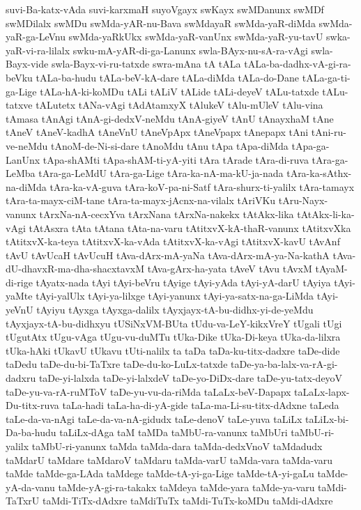 {suvi-Ba-katx-vAda
suvi-karxmaH
suyoVgayx
swKayx
swMDanunx
swMDf
swMDilalx
swMDu
swMda-yAR-nu-Bava
swMdayaR
swMda-yaR-diMda
swMda-yaR-ga-LeVnu
swMda-yaRkUkx
swMda-yaR-vanUnx
swMda-yaR-yu-tavU
swka-yaR-vi-ra-lilalx
swku-mA-yAR-di-ga-Lanunx
swla-BAyx-nu-sA-ra-vAgi
swla-Bayx-vide
swla-Bayx-vi-ru-tatxde
swra-mAna
tA
tALa
tALa-ba-dadhx-vA-gi-ra-beVku
tALa-ba-hudu
tALa-beV-kA-dare
tALa-diMda
tALa-do-Dane
tALa-ga-ti-ga-Lige
tALa-hA-ki-koMDu
tALi
tALiV
tALide
tALi-deyeV
tALu-tatxde
tALu-tatxve
tALutetx
tANa-vAgi
tAdAtamxyX
tAlukeV
tAlu-mUleV
tAlu-vina
tAmasa
tAnAgi
tAnA-gi-dedxV-neMdu
tAnA-giyeV
tAnU
tAnayxhaM
tAne
tAneV
tAneV-kadhA
tAneVnU
tAneVpApx
tAneVpapx
tAnepapx
tAni
tAni-ru-ve-neMdu
tAnoM-de-Ni-si-dare
tAnoMdu
tAnu
tApa
tApa-diMda
tApa-ga-LanUnx
tApa-shAMti
tApa-shAM-ti-yA-yiti
tAra
tArade
tAra-di-ruva
tAra-ga-LeMba
tAra-ga-LeMdU
tAra-ga-Lige
tAra-ka-nA-ma-kU-ja-nada
tAra-ka-sAthx-na-diMda
tAra-ka-vA-guva
tAra-koV-pa-ni-Satf
tAra-shurx-ti-yalilx
tAra-tamayx
tAra-ta-mayx-ciM-tane
tAra-ta-mayx-jAcnx-na-vilalx
tAriVKu
tAru-Nayx-vanunx
tArxNa-nA-cecxYva
tArxNana
tArxNa-nakekx
tAtAkx-lika
tAtAkx-li-ka-vAgi
tAtAsxra
tAta
tAtana
tAta-na-varu
tAtitxvX-kA-thaR-vanunx
tAtitxvXka
tAtitxvX-ka-teya
tAtitxvX-ka-vAda
tAtitxvX-ka-vAgi
tAtitxvX-kavU
tAvAnf
tAvU
tAvUcaH
tAvUcuH
tAva-dArx-mA-yaNa
tAva-dArx-mA-ya-Na-kathA
tAva-dU-dhavxR-ma-dha-shacxtavxM
tAva-gArx-ha-yata
tAveV
tAvu
tAvxM
tAyaM-di-rige
tAyatx-nada
tAyi
tAyi-beVru
tAyige
tAyi-yAda
tAyi-yA-darU
tAyiya
tAyi-yaMte
tAyi-yalUlx
tAyi-ya-lilxge
tAyi-yanunx
tAyi-ya-satx-na-ga-LiMda
tAyi-yeVnU
tAyiyu
tAyxga
tAyxga-dalilx
tAyxjayx-tA-bu-didhx-yi-de-yeMdu
tAyxjayx-tA-bu-didhxyu
tUSiNxVM-BUta
tUdu-va-LeY-kikxVreY
tUgali
tUgi
tUgutAtx
tUgu-vAga
tUgu-vu-duMTu
tUka-Dike
tUka-Di-keya
tUka-da-lilxra
tUka-hAki
tUkavU
tUkavu
tUti-nalilx
ta
taDa
taDa-ku-titx-dadxre
taDe-dide
taDedu
taDe-du-bi-TaTxre
taDe-du-ko-LuLx-tatxde
taDe-ya-ba-lalx-va-rA-gi-dadxru
taDe-yi-lalxda
taDe-yi-lalxdeV
taDe-yo-DiDx-dare
taDe-yu-tatx-deyoV
taDe-yu-va-rA-ruMToV
taDe-yu-vu-da-riMda
taLaLx-beV-Dapapx
taLaLx-lapx-Du-titx-ruva
taLa-hadi
taLa-ha-di-yA-gide
taLa-ma-Li-su-titx-dAdxne
taLeda
taLe-da-va-nAgi
taLe-da-va-nA-gidudx
taLe-denoV
taLe-yuva
taLiLx
taLiLx-bi-Da-ba-hudu
taLiLx-dAga
taM
taMDa
taMbU-ra-vanunx
taMbUri
taMbU-ri-yalilx
taMbU-ri-yanunx
taMda
taMda-dara
taMda-dedxVnoV
taMdadudx
taMdarU
taMdare
taMdaroV
taMdaru
taMda-varU
taMda-vara
taMda-varu
taMde
taMde-ga-LAda
taMdege
taMde-tA-yi-ga-Lige
taMde-tA-yi-gaLu
taMde-yA-da-vanu
taMde-yA-gi-ra-takakx
taMdeya
taMde-yara
taMde-ya-varu
taMdi-TaTxrU
taMdi-TiTx-dAdxre
taMdiTuTx
taMdi-TuTx-koMDu
taMdi-dAdxre
}
